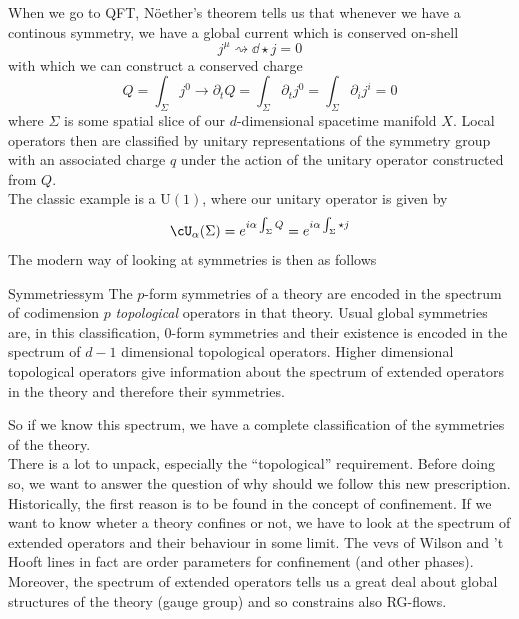 \documentclass[11pt]{article}
\theoremstyle{definition}
\numberwithin{equation}{section}
\newcommand*\U{\mathrm{U}}
\begin{document}
When we go to QFT, Nöether's theorem tells us that whenever we have a continous symmetry, we have a global current which is conserved on-shell
\begin{equation}
	j^{\mu}\rightsquigarrow\dd\star j=0
\end{equation}
with which we can construct a conserved charge
\begin{equation}
	Q=\int_{\Sigma}j^{0}\rightarrow \partial_{t}Q=\int_{\Sigma}\partial_{t}j^{0}=\int_{\Sigma}\partial_{i}j^{i}=0
\end{equation}
where $\Sigma$ is some spatial slice of our $d$-dimensional spacetime manifold $X$. Local operators then are classified by unitary representations of the symmetry group with an associated charge $q$ under the action of the unitary operator constructed from $Q$.\\
The classic example is a $\U(1)$, where our unitary operator is given by
\begin{equation}
	\cU_{\alpha}(\Sigma)=e^{i\alpha\int_{\Sigma}Q}=e^{i\alpha\int_{\Sigma}\star j}
\end{equation}
The modern way of looking at symmetries is then as follows
\begin{defn}{Symmetries}{sym}
	The $p$-form symmetries of a theory are encoded in the spectrum of codimension $p$ \textit{topological} operators in that theory. Usual global symmetries are, in this classification, $0$-form symmetries and their existence is encoded in the spectrum of $d-1$ dimensional topological operators. Higher dimensional topological operators give information about the spectrum of extended operators in the theory and therefore their symmetries.
\end{defn}
So if we know this spectrum, we have a complete classification of the symmetries of the theory.\\
There is a lot to unpack, especially the ``topological'' requirement. Before doing so, we want to answer the question of why should we follow this new prescription. Historically, the first reason is to be found in the concept of confinement. If we want to know wheter a theory confines or not, we have to look at the spectrum of extended operators and their behaviour in some limit. The vevs of Wilson and 't Hooft lines in fact are order parameters for confinement (and other phases).\\
Moreover, the spectrum of extended operators tells us a great deal about global structures of the theory (gauge group) and so constrains also RG-flows.
\end{document}
